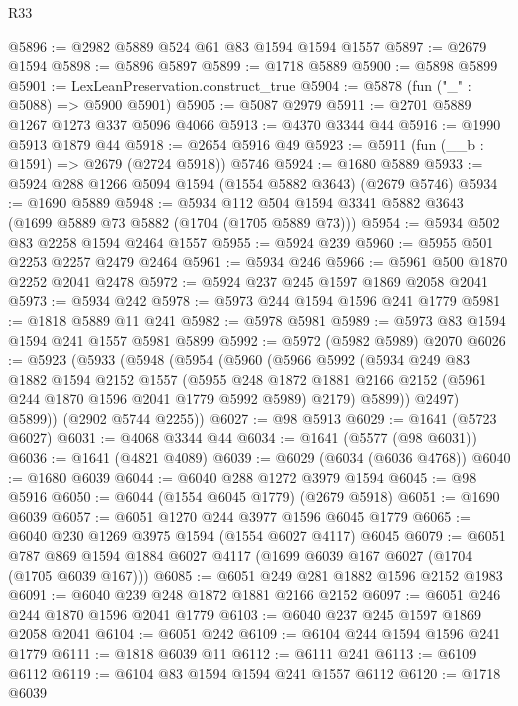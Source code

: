\begin{lexlean}{R33}
\begin{coremodule}
@5896 := @2982 @5889 @524 @61 @83 @1594 @1594 @1557
@5897 := @2679 @1594
@5898 := @5896 @5897
@5899 := @1718 @5889
@5900 := @5898 @5899
@5901 := LexLeanPreservation.construct_true
@5904 := @5878 (fun ("_" : @5088) => @5900 @5901)
@5905 := @5087 @2979
@5911 := @2701 @5889 @1267 @1273 @337 @5096 @4066
@5913 := @4370 @3344 @44
@5916 := @1990 @5913 @1879 @44
@5918 := @2654 @5916 @49
@5923 := @5911 (fun (__b : @1591) => @2679 (@2724 @5918)) @5746
@5924 := @1680 @5889
@5933 := @5924 @288 @1266 @5094 @1594 (@1554 @5882 @3643) (@2679 @5746)
@5934 := @1690 @5889
@5948 := @5934 @112 @504 @1594 @3341 @5882 @3643 (@1699 @5889 @73 @5882 (@1704 (@1705 @5889 @73)))
@5954 := @5934 @502 @83 @2258 @1594 @2464 @1557
@5955 := @5924 @239
@5960 := @5955 @501 @2253 @2257 @2479 @2464
@5961 := @5934 @246
@5966 := @5961 @500 @1870 @2252 @2041 @2478
@5972 := @5924 @237 @245 @1597 @1869 @2058 @2041
@5973 := @5934 @242
@5978 := @5973 @244 @1594 @1596 @241 @1779
@5981 := @1818 @5889 @11 @241
@5982 := @5978 @5981
@5989 := @5973 @83 @1594 @1594 @241 @1557 @5981 @5899
@5992 := @5972 (@5982 @5989) @2070
@6026 := @5923
    (@5933
      (@5948
        (@5954
          (@5960
            (@5966
              @5992
              (@5934
                @249
                @83
                @1882
                @1594
                @2152
                @1557
                (@5955
                  @248
                  @1872
                  @1881
                  @2166
                  @2152
                  (@5961 @244 @1870 @1596 @2041 @1779 @5992 @5989)
                  @2179)
                @5899))
            @2497)
          @5899))
      (@2902 @5744 @2255))
@6027 := @98 @5913
@6029 := @1641 (@5723 @6027)
@6031 := @4068 @3344 @44
@6034 := @1641 (@5577 (@98 @6031))
@6036 := @1641 (@4821 @4089)
@6039 := @6029 (@6034 (@6036 @4768))
@6040 := @1680 @6039
@6044 := @6040 @288 @1272 @3979 @1594
@6045 := @98 @5916
@6050 := @6044 (@1554 @6045 @1779) (@2679 @5918)
@6051 := @1690 @6039
@6057 := @6051 @1270 @244 @3977 @1596 @6045 @1779
@6065 := @6040 @230 @1269 @3975 @1594 (@1554 @6027 @4117) @6045
@6079 := @6051 @787 @869 @1594 @1884 @6027 @4117 (@1699 @6039 @167 @6027 (@1704 (@1705 @6039 @167)))
@6085 := @6051 @249 @281 @1882 @1596 @2152 @1983
@6091 := @6040 @239 @248 @1872 @1881 @2166 @2152
@6097 := @6051 @246 @244 @1870 @1596 @2041 @1779
@6103 := @6040 @237 @245 @1597 @1869 @2058 @2041
@6104 := @6051 @242
@6109 := @6104 @244 @1594 @1596 @241 @1779
@6111 := @1818 @6039 @11
@6112 := @6111 @241
@6113 := @6109 @6112
@6119 := @6104 @83 @1594 @1594 @241 @1557 @6112
@6120 := @1718 @6039

\end{coremodule}
\end{lexlean}
